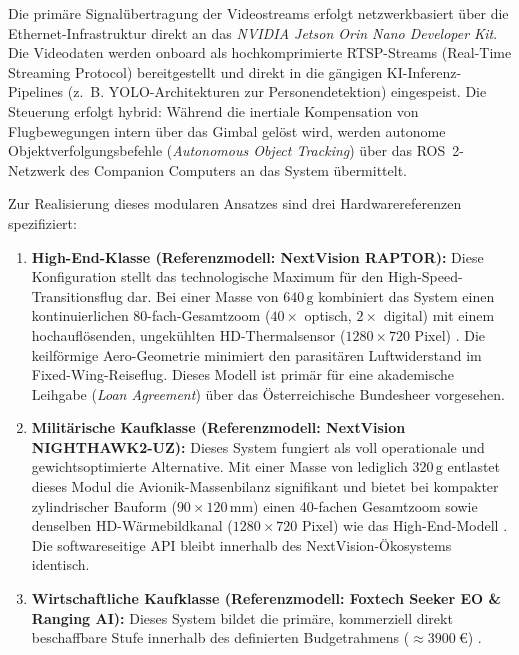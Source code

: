 Die primäre Signalübertragung der Videostreams erfolgt netzwerkbasiert über die Ethernet-Infrastruktur direkt an das \textit{NVIDIA Jetson Orin Nano Developer Kit}. Die Videodaten werden onboard als hochkomprimierte RTSP-Streams 
(Real-Time Streaming Protocol) bereitgestellt und direkt in die gängigen KI-Inferenz-Pipelines (z.~B. YOLO-Architekturen zur Personendetektion) eingespeist. Die Steuerung erfolgt hybrid: Während die inertiale Kompensation von Flugbewegungen 
intern über das Gimbal gelöst wird, werden autonome Objektverfolgungsbefehle (\textit{Autonomous Object Tracking}) über das ROS~2-Netzwerk des Companion Computers an das System übermittelt.

Zur Realisierung dieses modularen Ansatzes sind drei Hardwarereferenzen spezifiziert:

\begin{enumerate}
    \item \textbf{High-End-Klasse (Referenzmodell: NextVision RAPTOR):} Diese Konfiguration stellt das technologische Maximum für den High-Speed-Transitionsflug dar. Bei einer Masse von $640\,\text{g}$ kombiniert das System 
                                                                        einen kontinuierlichen 80-fach-Gesamtzoom ($40\times$ optisch, $2\times$ digital) mit einem hochauflösenden, ungekühlten HD-Thermalsensor ($1280 \times 720$ Pixel) \cite{nextvision_raptor}.
                                                                         Die keilförmige Aero-Geometrie minimiert den parasitären Luftwiderstand im Fixed-Wing-Reiseflug. Dieses Modell ist primär für eine akademische Leihgabe (\textit{Loan Agreement}) 
                                                                         über das Österreichische Bundesheer vorgesehen.
    \item \textbf{Militärische Kaufklasse (Referenzmodell: NextVision NIGHTHAWK2-UZ):} Dieses System fungiert als voll operationale und gewichtsoptimierte Alternative. Mit einer Masse von lediglich $320\,\text{g}$ entlastet dieses Modul 
                                                                                       die Avionik-Massenbilanz signifikant und bietet bei kompakter zylindrischer Bauform ($90 \times 120\,\text{mm}$) einen 40-fachen Gesamtzoom sowie denselben 
                                                                                       HD-Wärmebildkanal ($1280 \times 720$ Pixel) wie das High-End-Modell \cite{nextvision_nighthawk}. Die softwareseitige API bleibt innerhalb des NextVision-Ökosystems identisch.
    \item \textbf{Wirtschaftliche Kaufklasse (Referenzmodell: Foxtech Seeker EO \& Ranging AI):} Dieses System bildet die primäre, kommerziell direkt beschaffbare Stufe innerhalb des definierten Budgetrahmens ($\approx \SI{3900}{\text{€}}$) \cite{foxtech_seeker}. 

\end{enumerate}
